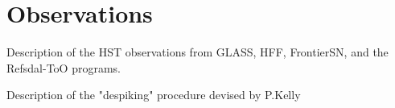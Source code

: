 \section{Observations}\label{sec:Observations}

Description of the HST observations from GLASS, HFF, FrontierSN, and the Refsdal-ToO programs. 

Description of the "despiking" procedure devised by P.Kelly



